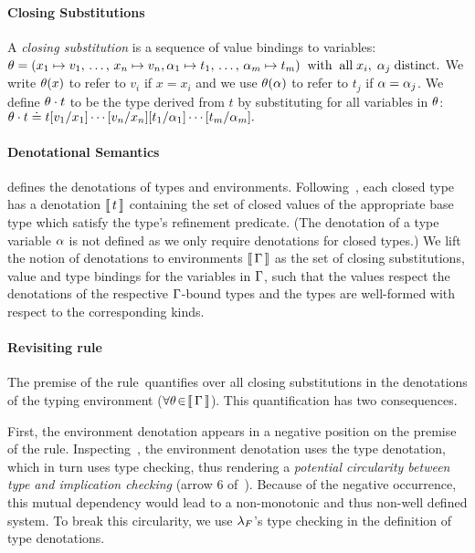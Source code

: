 \paragraph{Closing Substitutions}
A \emph{closing substitution} is a sequence
of value bindings to variables:
$
    \clsub = (x_1\mapsto v_1,\,\ldots,\, x_n\mapsto v_n, \al_1 \mapsto t_1, \,\ldots,\, \al_m\mapsto t_m)
    \;\; {\rm with\;\; all}\; x_i,\; \al_j\; {\rm distinct.}
$
%
We write $\clsub(x)$ to refer to $v_i$ if $x = x_i$
and we use $\clsub(\al)$ to refer to $t_j$ if $\al = \al_j$.
%
We define $\applysubst{\clsub}{t}$ to be the type derived from $t$
by substituting for all variables in $\clsub$:
%
$
  \applysubst{\clsub}{t} \defeq \subst{t}{x_1}{v_1}\cdots\subst{}{x_n}{v_n}\subst{}{\al_1}{t_1}\cdots\subst{}{\al_m}{t_m}.
$
%


\paragraph{Denotational Semantics}
 defines the denotations of types and environments.
Following~\citet{flanagan06}, 
each closed type has a denotation $\denote{\stype}$
containing the set of closed values
of the appropriate base type
which satisfy the type's refinement
predicate.
(The denotation of a type variable $\al$
is not defined as we only require
denotations for closed types.)
%
We lift the notion of denotations to environments $\denote{\tcenv}$
as the set of closing substitutions, \ie value
and type bindings for the variables in $\tcenv$, such that the
values respect the denotations of the respective $\tcenv$-bound
types and the types are well-formed with respect
to the corresponding kinds.


\paragraph{Revisiting rule~\iDen}
The premise of the rule~\iDen quantifies 
over all closing substitutions in the denotations of the 
typing environment 
(\ie $\forall \clsub\!\in\!\denote{\tcenv}$). 
This quantification has two consequences. 

First, the environment denotation appears in a negative position 
on the premise of the rule. Inspecting~, 
the environment denotation uses the type denotation, which in turn uses 
type checking, thus rendering a \textit{potential circularity
between type and implication checking} (arrow 6 of~). 
Because of the negative occurrence, this mutual dependency 
would lead to a non-monotonic and thus non-well defined system. 
To break this circularity, we use $\sysf$'s type checking in the definition 
of type denotations. 

